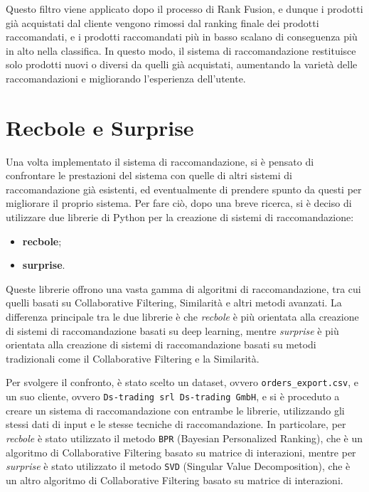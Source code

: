 Questo filtro viene applicato dopo il processo di Rank Fusion, e dunque i prodotti già acquistati dal cliente vengono rimossi dal ranking finale dei prodotti raccomandati, e i prodotti raccomandati più in basso scalano di conseguenza più in alto nella classifica. In questo modo, il sistema di raccomandazione restituisce solo prodotti nuovi o diversi da quelli già acquistati, aumentando la varietà delle raccomandazioni e migliorando l'esperienza dell'utente.


\section{Recbole e Surprise}

Una volta implementato il sistema di raccomandazione, si è pensato di confrontare le prestazioni del sistema con quelle di altri sistemi di raccomandazione già esistenti, ed eventualmente di prendere spunto da questi per migliorare il proprio sistema.
Per fare ciò, dopo una breve ricerca, si è deciso di utilizzare due librerie di Python per la creazione di sistemi di raccomandazione:
\begin{itemize}
    \item \textbf{\gls{recbole}};
    \item \textbf{\gls{surprise}}.
\end{itemize}

Queste librerie offrono una vasta gamma di algoritmi di raccomandazione, tra cui quelli basati su Collaborative Filtering, Similarità e altri metodi avanzati. La differenza principale tra le due librerie è che \emph{recbole} è più orientata alla creazione di sistemi di raccomandazione basati su deep learning, mentre \emph{surprise} è più orientata alla creazione di sistemi di raccomandazione basati su metodi tradizionali come il Collaborative Filtering e la Similarità.

Per svolgere il confronto, è stato scelto un dataset, ovvero \texttt{orders_export.csv}, e un suo cliente, ovvero \texttt{Ds-trading srl Ds-trading GmbH}, e si è proceduto a creare un sistema di raccomandazione con entrambe le librerie, utilizzando gli stessi dati di input e le stesse tecniche di raccomandazione. In particolare, per \emph{recbole} è stato utilizzato il metodo \texttt{BPR} (Bayesian Personalized Ranking), che è un algoritmo di Collaborative Filtering basato su matrice di interazioni, mentre per \emph{surprise} è stato utilizzato il metodo \texttt{SVD} (Singular Value Decomposition), che è un altro algoritmo di Collaborative Filtering basato su matrice di interazioni.

